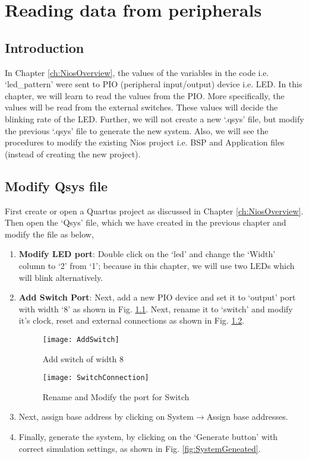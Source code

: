 \chapter{Reading data from peripherals} \label{ch:ReadSwitch}

\graphicspath{{Chapters/NiosReadSwitch/Figures/}}


\section{Introduction}
In Chapter \ref{ch:NiosOverview}, the values of the variables in the code i.e. `led\_pattern' were sent to PIO (peripheral input/output) device  i.e. LED. In this chapter, we will learn to read the values from the PIO. More specifically, the values will be read from the external switches. These values will decide the blinking rate of the LED. Further, we will not create a new `.qsys' file, but modify the previous `.qsys' file to generate the new system. Also, we will see the procedures to modify the existing Nios project i.e. BSP and Application files (instead of creating the new project). 

\section{Modify Qsys file}\label{sec:ModifyQysFile}
First create or open a Quartus project as discussed in Chapter \ref{ch:NiosOverview}. Then open the `Qsys' file, which we have created in the previous chapter and modify the file as below, 
\begin{enumerate}
	\item \textbf{Modify LED port}: Double click on the `led' and change the `Width' column to `2' from `1'; because in this chapter, we will use two LEDs which will blink alternatively. 
	\item \textbf{Add Switch Port}: Next, add a new PIO device and set it to `output' port with width `8' as shown in Fig. \ref{fig:AddSwitch}. Next, rename it to `switch' and modify it's clock, reset and external connections as shown in Fig. \ref{fig:SwitchConnection}. 
	
	\begin{figure}[!h]
		\centering
		\texttt{[image: AddSwitch]}
		\caption{Add switch of width 8}
		\label{fig:AddSwitch}
	\end{figure}
	\begin{figure}[!h]
		\centering
		\texttt{[image: SwitchConnection]}
		\caption{Rename and Modify the port for Switch}
		\label{fig:SwitchConnection}
	\end{figure}
	\item Next, assign base address by clicking on System$\rightarrow$Assign base addresses. 
	\item Finally, generate the system, by clicking on the `Generate button' with correct simulation settings, as shown in Fig. \ref{fig:SystemGeneated}.
\end{enumerate} 

